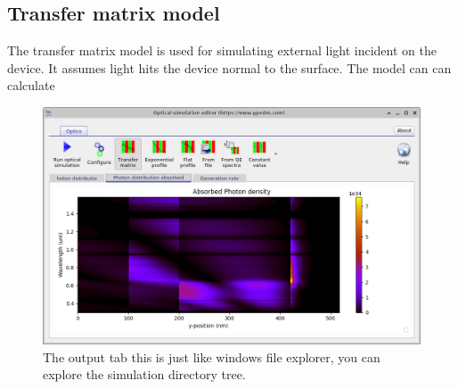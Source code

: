 \subsection{Transfer matrix model}
The transfer matrix model is used for simulating external light incident on the device. It assumes light hits the device normal to the surface.  The model can can calculate 

\begin{figure}[H]
\centering
\includegraphics[width=1.0\textwidth,height=0.6\textwidth]{./images/opticalsimulation4.png}
\caption{The output tab this is just like windows file explorer, you can explore the simulation directory tree.}
\label{fig:transfermatrix0}
\end{figure}

